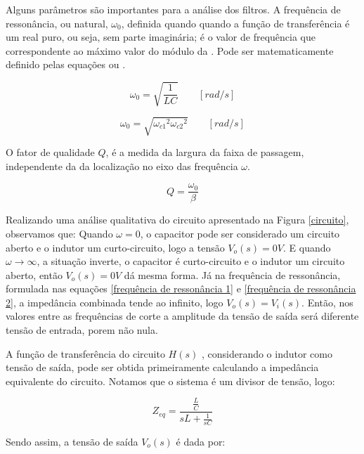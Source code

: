 Alguns parâmetros são importantes para a análise dos filtros. A frequência de ressonância, ou natural, $\omega_0$, definida quando quando a função de transferência é um real puro, ou seja, sem parte imaginária; é o valor de frequência que correspondente ao máximo valor do módulo da . Pode ser matematicamente definido pelas equações  ou
.

\begin {equation}
\omega_0 = \sqrt{\frac{1}{L C}} \qquad [rad/s]
\label{frequência de ressonância 1}
\end {equation}

\begin {equation}
\omega_0 = \sqrt{ {\omega_{c1}}^2 {\omega_{c2}}^2 } \qquad [rad/s]
\label{frequência de ressonância 2}
\end {equation}

O fator de qualidade $Q$, é a medida da largura da faixa de passagem, independente da da localização no eixo das frequência $\omega$.

\begin {equation}
Q = \frac{\omega_0}{\beta}
\label{fator de qualidade}
\end {equation}

Realizando uma análise qualitativa do circuito apresentado na Figura \ref{circuito}, observamos que: Quando $\omega = 0$, o capacitor pode ser considerado um circuito aberto e o indutor um curto-circuito, logo a tensão $V_o(s) = 0 V$. E quando $\omega \rightarrow \infty $, a situação inverte, o capacitor é curto-circuito e o indutor um circuito aberto, então $V_o(s) = 0 V$ dá mesma forma. Já na frequência de ressonância, formulada nas equações \ref{frequência de ressonância 1} e \ref{frequência de ressonância 2}, a impedância combinada tende ao infinito, logo $V_o(s) = V_i(s)$.
Então, nos valores entre as frequências de corte a amplitude da tensão de saída será diferente tensão de entrada, porem não nula.

A função de transferência do circuito $H(s)$ , considerando o indutor como tensão de saída, pode ser obtida primeiramente calculando a impedância equivalente do circuito. Notamos que o sistema é um divisor de tensão, logo:

\begin {equation}
Z_{eq} = \frac{ \frac{L}{C} }{ sL + \frac{1}{sC}}
\end {equation}

Sendo assim, a tensão de saída $V_o (s)$ é dada por:

